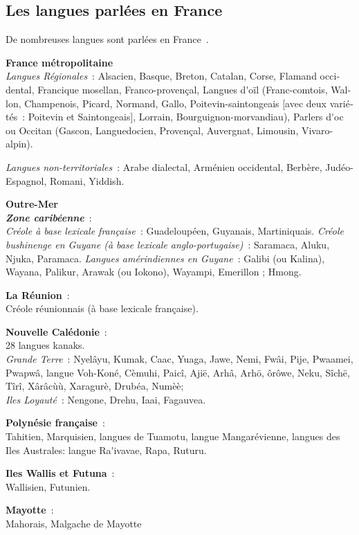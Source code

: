 \begin{french}
\begin{multicols}{2}
\subsection{Les langues parlées en France}
\label{languagesSpokenInTheFrance}
De nombreuses langues sont parlées en France~\cite{languesparleesfrance}.

{\bf France métropolitaine}\\
{\it Langues Régionales}~: Alsacien, Basque, Breton, Catalan, Corse, Flamand occidental, Francique mosellan, Franco-provençal, Langues d{\mbox '}oïl (Franc-comtois, Wallon, Champenois, Picard, Normand, Gallo, Poitevin-saintongeais [avec deux variétés~: Poitevin et Saintongeais], Lorrain, Bourguignon-morvandiau), Parlers d{\mbox '}oc ou Occitan (Gascon, Languedocien, Provençal, Auvergnat, Limousin, Vivaro-alpin).

{\it Langues non-territoriales}~: Arabe dialectal, Arménien occidental, Berbère, Judéo-Espagnol, Romani, Yiddish.

{\bf Outre-Mer}\\
\textbf{ \emph{Zone caribéenne}}~:\\
{\it Créole à base lexicale française}~: Guadeloupéen, Guyanais, Martiniquais.
{\it Créole bushinenge en Guyane (à base lexicale anglo-portugaise)}~: Saramaca, Aluku, Njuka, Paramaca.
{\it Langues amérindiennes en Guyane}~: Galibi (ou Kalina), Wayana, Palikur, Arawak (ou Iokono), Wayampi, Emerillon ; Hmong.

{\bf La Réunion}~:\\
Créole réunionnais (à base lexicale française).

{\bf Nouvelle Calédonie}~:\\
28 langues kanaks.\\
{\it Grande Terre}~: Nyelâyu, Kumak, Caac, Yuaga, Jawe, Nemi, Fwâi, Pije, Pwaamei, Pwapwâ, langue Voh-Koné, Cèmuhi, Paicî, Ajië, Arhâ, Arhö, ôrôwe, Neku, Sîchë, Tîrî, Xârâcùù, Xaragurè, Drubéa, Numèè; \\
{\it Iles Loyauté}~: Nengone, Drehu, Iaai, Fagauvea.

{\bf Polynésie française}~:\\
Tahitien, Marquisien, langues de Tuamotu, langue Mangarévienne, langues des Iles Australes: langue Ra{\mbox '}ivavae, Rapa, Ruturu.

{\bf Iles Wallis et Futuna}~:\\
Wallisien, Futunien.

{\bf Mayotte}~:\\
Mahorais, Malgache de Mayotte


\end{multicols}
\end{french}
